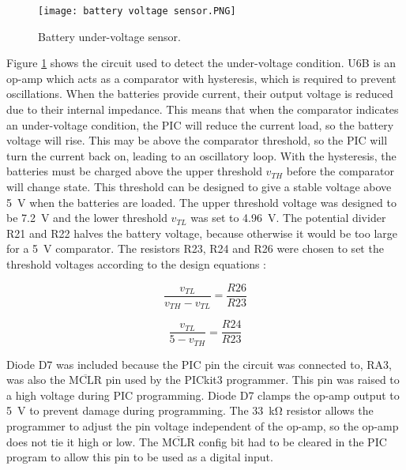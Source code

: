 \begin{figure}[htb]
	\centering
	\texttt{[image: battery voltage sensor.PNG]}
	\caption{Battery under-voltage sensor.}
	\label{fig: battery voltage sensor}
\end{figure}

Figure \ref{fig: battery voltage sensor} shows the circuit used to detect the under-voltage condition. U6B is an op-amp which acts as a comparator with hysteresis, which is required to prevent oscillations. When the batteries provide current, their output voltage is reduced due to their internal impedance. This means that when the comparator indicates an under-voltage condition, the PIC will reduce the current load, so the battery voltage will rise. This may be above the comparator threshold, so the PIC will turn the current back on, leading to an oscillatory loop. With the hysteresis, the batteries must be charged above the upper threshold $v_{TH}$ before the comparator will change state. This threshold can be designed to give a stable voltage above \SI{5}{\volt} when the batteries are loaded. The upper threshold voltage was designed to be \SI{7.2}{\volt} and the lower threshold $v_{TL}$ was set to \SI{4.96}{\volt}. The potential divider R21 and R22 halves the battery voltage, because otherwise it would be too large for a \SI{5}{\volt} comparator. The resistors R23, R24 and R26 were chosen to set the threshold voltages according to the design equations \cite{hysteresis}:%
\begin{multicols}{2}
\begin{equation}
\frac{v_{TL}}{v_{TH} - v_{TL}} = \frac{R26}{R23}
\end{equation}

\begin{equation}
\frac{v_{TL}}{5 - v_{TH}} = \frac{R24}{R23}
\end{equation}
\end{multicols}

Diode D7 was included because the PIC pin the circuit was connected to, RA3, was also the $\overline{\text{MCLR}}$ pin used by the PICkit3 programmer. This pin was raised to a high voltage during PIC programming. Diode D7 clamps the op-amp output to \SI{5}{\volt} to prevent damage during programming. The \SI{33}{\kilo\ohm} resistor allows the programmer to adjust the pin voltage independent of the op-amp, so the op-amp does not tie it high or low. The $\overline{\text{MCLR}}$ config bit had to be cleared in the PIC program to allow this pin to be used as a digital input. \\

